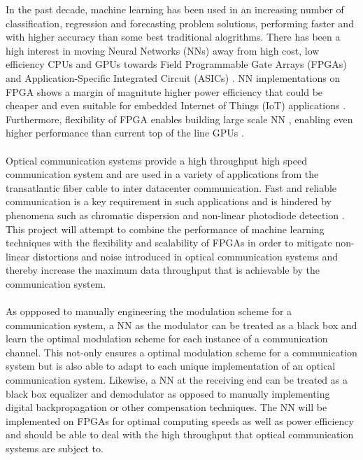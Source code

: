 In the past decade, machine learning has been used in an increasing number of classification, regression and forecasting problem solutions, performing faster and with higher accuracy than some best traditional alogrithms. There has been a high interest in moving Neural Networks (NNs) away from high cost, low efficiency CPUs and GPUs towards Field Programmable Gate Arrays (FPGAs) and Application-Specific Integrated Circuit (ASICs) \autocite{7929192}. NN implementations on FPGA shows a margin of magnitute higher power efficiency that could be cheaper and even suitable for embedded Internet of Things (IoT) applications \autocite{7799795,8954866,8469659,8330546,8693488}. Furthermore, flexibility of FPGA enables building large scale NN \autocite{8823487,7045812}, enabling even higher performance than current top of the line GPUs \autocite{8702332,8412552}. 
\\
\\
Optical communication systems provide a high throughput high speed communication system and are used in a variety of applications from the transatlantic fiber cable to inter datacenter communication. Fast and reliable communication is a key requirement in such applications and is hindered by phenomena such as chromatic dispersion and non-linear photodiode detection \autocite{8433895}. This project will attempt to combine the performance of machine learning techniques with the flexibility and scalability of FPGAs in order to mitigate non-linear distortions and noise introduced in optical communication systems and thereby increase the maximum data throughput that is achievable by the communication system. 
\\
\\
As oppposed to manually engineering the modulation scheme for a communication system, a NN as the modulator can be treated as a black box and learn the optimal modulation scheme for each instance of a communication channel. This not-only ensures a optimal modulation scheme for a communication system but is also able to adapt to each unique implementation of an optical communication system. Likewise, a NN at the receiving end can be treated as a black box equalizer and demodulator  as opposed to manually implementing digital backpropagation or other compensation techniques. The NN will be implemented on FPGAs for optimal computing speeds as well as power efficiency and should be able to deal with the high throughput that optical communication systems are subject to. 